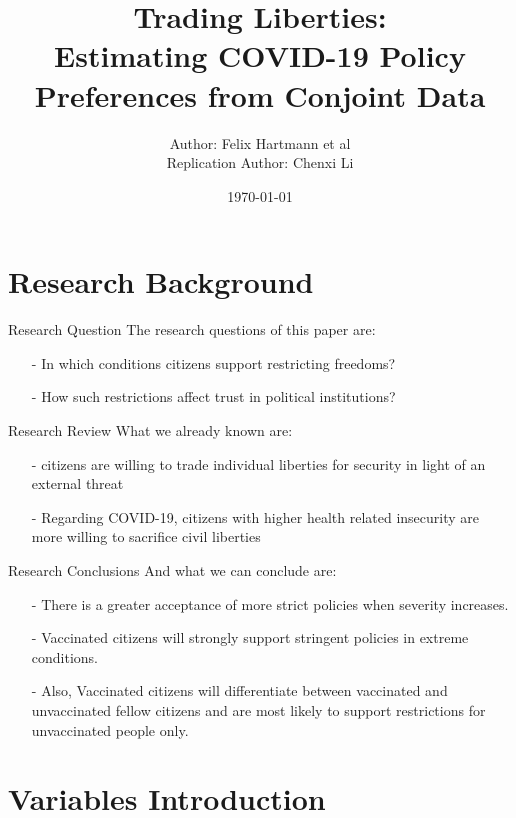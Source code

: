 \documentclass{beamer}
\title{Trading Liberties: \\
Estimating COVID-19 Policy Preferences from Conjoint Data}
\date{\today}
\author{Author: Felix Hartmann et al \\
Replication Author: Chenxi Li}
\institute{Trinity College Dublin\\College Green, Dublin 2 \\ \par Lic8@tcd.ie}
\begin{document}
\maketitle
\section{Research Background}

\begin{frame}{Research Question}
	\noindent The research questions of this paper are:
	\begin{itemize}
		\item[-] In which conditions citizens support restricting freedoms?
		\item[-] How such restrictions affect trust in political institutions?
	\end{itemize}
\end{frame}

\begin{frame}{Research Review}
\noindent What we already known are:
\begin{itemize}
	\item[-] citizens are willing to trade individual liberties for security in light of an external threat \citep{davis2004civil}
	\item[-] Regarding COVID-19, citizens with higher health related insecurity are more willing to sacrifice civil liberties \citep{stantcheva2020civil}
\end{itemize}
\end{frame}

\begin{frame}{Research Conclusions}
\noindent And what we can conclude are:
\begin{itemize}
	\item[-] There is a greater acceptance of more strict policies when severity increases.
	\item[-] Vaccinated citizens will strongly support stringent policies in extreme conditions.
	\item[-] Also, Vaccinated citizens will differentiate between vaccinated and unvaccinated fellow citizens and are most likely to support restrictions for unvaccinated people only.  
\end{itemize}
\end{frame}

\section{Variables Introduction}
\end{document}
